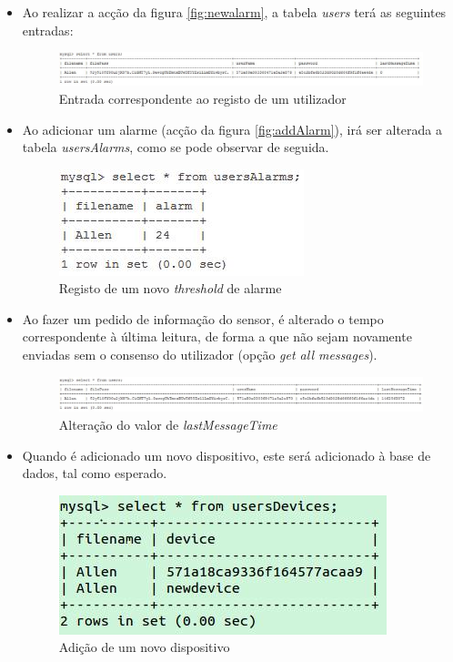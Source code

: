 \documentclass[a4paper]{article}
\begin{document}
\begin{itemize}
\item Ao realizar a acção da figura \ref{fig:newalarm}, a tabela \textit{users} terá as seguintes entradas:

\begin{figure}[H]
\includegraphics[width=\linewidth]{logfirst.png}
  \caption{Entrada correspondente ao registo de um utilizador}\label{fig:db-first}
\end{figure}

\item Ao adicionar um alarme (acção da figura \ref{fig:addAlarm}), irá ser alterada a tabela \textit{usersAlarms}, como se pode observar de seguida.

\begin{figure}[H]
\centering
\includegraphics[scale=0.5]{newalarmm.png}
  \caption{Registo de um novo \textit{threshold} de alarme}\label{fig:newalarmm}
\end{figure}

\item Ao fazer um pedido de informação do sensor, é alterado o tempo correspondente à última leitura, de forma a que não sejam novamente enviadas sem o consenso do utilizador (opção \textit{get all messages}).

\begin{figure}[H]
\centering
\includegraphics[width=\linewidth]{newtime.png}
  \caption{Alteração do valor de \textit{lastMessageTime}}\label{fig:newtime}
\end{figure}

\item Quando é adicionado um novo dispositivo, este será adicionado à base de dados, tal como esperado.

\begin{figure}[H]
\centering
\includegraphics[width=\linewidth]{newdevvv.png}
  \caption{Adição de um novo dispositivo}\label{fig:newdevvv}
\end{figure}


\end{itemize}
\end{document}
